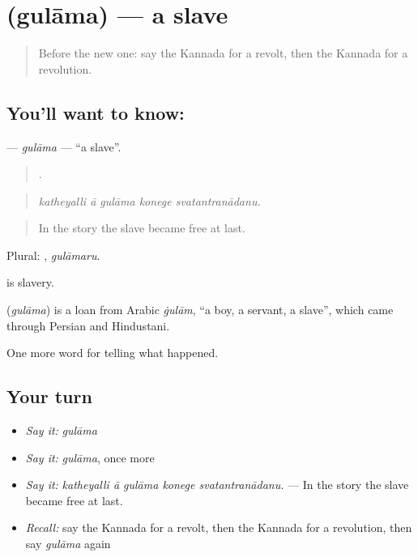 \section[\texorpdfstring{\kn{ಗುಲಾಮ} (gulāma)}{ಗುಲಾಮ (gulāma)}]{ (gulāma) — a slave}

\label{lesson:KA-C352-gulama}



\begin{quote}
Before the new one: say the Kannada for a revolt, then the Kannada for a revolution.
\end{quote}

\subsection*{You'll want to know: }
\textbf{} — \emph{gulāma} — \textquotedblleft{}a slave\textquotedblright{}.

\begin{quote}
    .
\end{quote}

\begin{quote}
\emph{katheyalli ā gulāma konege svatantranādanu.}
\end{quote}

\begin{quote}
In the story the slave became free at last.
\end{quote}

Plural: , \emph{gulāmaru}.

 is slavery.

\begin{cousinweb}
\textbf{} (\emph{gulāma}) is a loan from Arabic \emph{ġulām}, \textquotedblleft{}a boy, a servant, a slave\textquotedblright{}, which came through Persian and Hindustani.
\end{cousinweb}

\begin{grammarlens}[title={What you've built}]
One more word for telling what happened.
\end{grammarlens}

\subsection*{Your turn}
\begin{itemize}
\raggedright
  \item \emph{Say it:} \emph{gulāma}
  \item \emph{Say it:} \emph{gulāma}, once more
  \item \emph{Say it:} \emph{katheyalli ā gulāma konege svatantranādanu.} — In the story the slave became free at last.
  \item \emph{Recall:} say the Kannada for a revolt, then the Kannada for a revolution, then say \emph{gulāma} again
\end{itemize}

